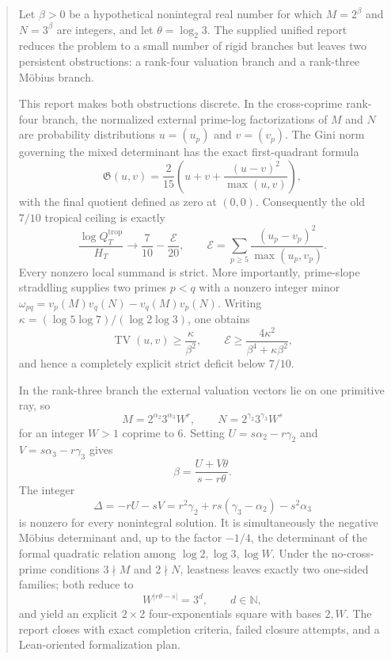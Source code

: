 \documentclass[11pt,oneside]{article}
\theoremstyle{research}
\theoremstyle{definition}
\newcommand{\N}{\mathbb N}
\newcommand{\E}{\mathcal E}
\newcommand{\TV}{\operatorname{TV}}
\newcommand{\trop}{\mathrm{trop}}
\begin{document}
\begin{abstract}
Let $\beta>0$ be a hypothetical nonintegral real number for which
$M=2^\beta$ and $N=3^\beta$ are integers, and let
$\theta=\log_2 3$.  The supplied unified report reduces the problem to a
small number of rigid branches but leaves two persistent obstructions: a
rank-four valuation branch and a rank-three M\"obius branch.

This report makes both obstructions discrete.  In the cross-coprime rank-four
branch, the normalized external prime-log factorizations of $M$ and $N$ are
probability distributions $u=(u_p)$ and $v=(v_p)$.  The Gini norm governing the
mixed determinant has the exact first-quadrant formula
\[
 \mathfrak G(u,v)=\frac{2}{15}\left(u+v+
 \frac{(u-v)^2}{\max(u,v)}\right),
\]
with the final quotient defined as zero at $(0,0)$.  Consequently the old
$7/10$ tropical ceiling is exactly
\[
 \frac{\log Q_T^{\trop}}{H_T}\longrightarrow
 \frac{7}{10}-\frac{\E}{20},
 \qquad
 \E=\sum_{p\ge5}\frac{(u_p-v_p)^2}{\max(u_p,v_p)}.
\]
Every nonzero local summand is strict.  More importantly, prime-slope
straddling supplies two primes $p<q$ with a nonzero integer minor
$\omega_{pq}=v_p(M)v_q(N)-v_q(M)v_p(N)$.  Writing
$\kappa=(\log5\log7)/(\log2\log3)$, one obtains
\[
 \TV(u,v)\ge \frac{\kappa}{\beta^2},\qquad
 \E\ge \frac{4\kappa^2}{\beta^4+\kappa\beta^2},
\]
and hence a completely explicit strict deficit below $7/10$.

In the rank-three branch the external valuation vectors lie on one primitive
ray, so
\[
 M=2^{\alpha_2}3^{\alpha_3}W^r,
 \qquad
 N=2^{\gamma_2}3^{\gamma_3}W^s
\]
for an integer $W>1$ coprime to $6$.  Setting
$U=s\alpha_2-r\gamma_2$ and $V=s\alpha_3-r\gamma_3$ gives
\[
 \beta=\frac{U+V\theta}{s-r\theta}.
\]
The integer
\[
 \Delta=-rU-sV
 =r^2\gamma_2+rs(\gamma_3-\alpha_2)-s^2\alpha_3
\]
is nonzero for every nonintegral solution.  It is simultaneously the negative
M\"obius determinant and, up to the factor $-1/4$, the determinant of the
formal quadratic relation among $\log2,\log3,\log W$.  Under the no-cross-prime
conditions $3\nmid M$ and $2\nmid N$, leastness leaves exactly two one-sided
families; both reduce to
\[
 W^{\lvert r\theta-s\rvert}=3^d,
 \qquad d\in\N,
\]
and yield an explicit $2\times2$ four-exponentials square with bases $2,W$.
The report closes with exact completion criteria, failed closure attempts,
and a Lean-oriented formalization plan.
\end{abstract}

\tableofcontents
\newpage
\end{document}
